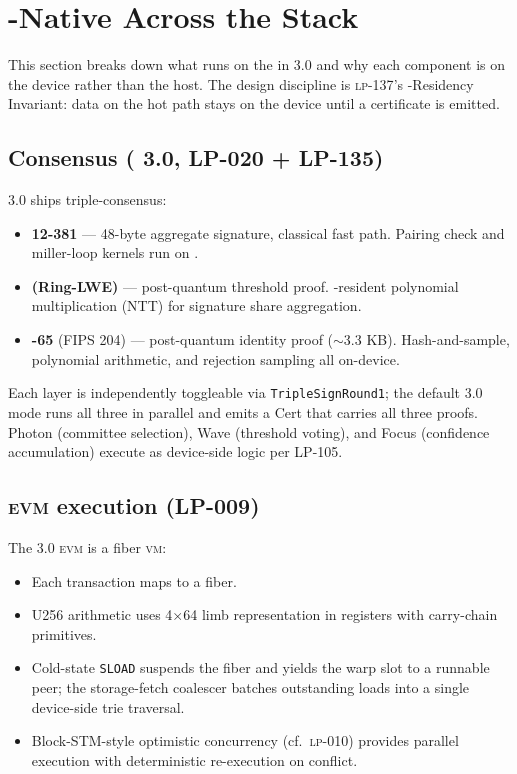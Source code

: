 \section{\GPU{}-Native Across the Stack}
\label{sec:gpu-native}

This section breaks down what runs on the \GPU{} in \Zoo{} 3.0 and why each
component is on the device rather than the host. The design discipline is
\textsc{lp-137}'s \GPU{}-Residency Invariant: data on the hot path stays on
the device until a certificate is emitted.

\subsection{Consensus (\Quasar{} 3.0, LP-020 + LP-135)}

\Quasar{} 3.0 ships triple-consensus:

\begin{itemize}[leftmargin=1.2em]
  \item \textbf{\BLS{}12-381} --- 48-byte aggregate signature, classical
        fast path. Pairing check and miller-loop kernels run on \GPU{}.
  \item \textbf{\Corona{} (Ring-LWE)} --- post-quantum threshold proof.
        \GPU{}-resident polynomial multiplication (NTT) for signature
        share aggregation.
  \item \textbf{\MLDSA{}-65} (FIPS 204) --- post-quantum identity proof
        ($\sim$3.3 KB). Hash-and-sample, polynomial arithmetic, and
        rejection sampling all on-device.
\end{itemize}

Each layer is independently toggleable via \texttt{TripleSignRound1}; the
default 3.0 mode runs all three in parallel and emits a \Quasar{}Cert
that carries all three proofs. Photon (committee selection), Wave
(threshold voting), and Focus (confidence accumulation) execute as
device-side logic per LP-105.

\subsection{\textsc{evm} execution (LP-009)}

The \Zoo{} 3.0 \textsc{evm} is a fiber \textsc{vm}:

\begin{itemize}[leftmargin=1.2em]
  \item Each transaction maps to a \GPU{} fiber.
  \item U256 arithmetic uses 4$\times$64 limb representation in registers
        with carry-chain primitives.
  \item Cold-state \texttt{SLOAD} suspends the fiber and yields the warp
        slot to a runnable peer; the storage-fetch coalescer batches
        outstanding loads into a single device-side trie traversal.
  \item Block-STM-style optimistic concurrency
        \cite{zoo-per-llm-chains} (cf.~\textsc{lp-010}) provides parallel
        execution with deterministic re-execution on conflict.
\end{itemize}

